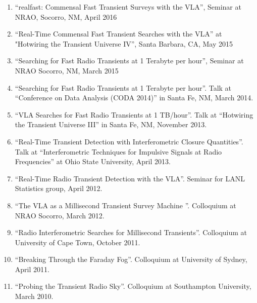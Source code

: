\documentclass[11pt]{article}
\begin{document}
\begin{enumerate}


    \item ``realfast: Commensal Fast Transient Surveys with the VLA'', Seminar at NRAO, Socorro, NM, April 2016

    \item ``Real-Time Commensal Fast Transient Searches with the VLA'' at "Hotwiring the Transient Universe IV'', Santa Barbara, CA, May 2015

    \item ``Searching for Fast Radio Transients at 1 Terabyte per hour'', Seminar at NRAO Socorro, NM, March 2015

    \item ``Searching for Fast Radio Transients at 1 Terabyte per hour''. Talk at ``Conference on Data Analysis (CODA 2014)'' in Santa Fe, NM, March 2014.

    \item ``VLA Searches for Fast Radio Transients at 1 TB/hour''. Talk at ``Hotwiring the Transient Universe III'' in Santa Fe, NM, November 2013.

    \item ``Real-Time Transient Detection with Interferometric Closure Quantities''. Talk at ``Interferometric Techniques for Impulsive Signals at Radio Frequencies'' at Ohio State University, April 2013.

    \item ``Real-Time Radio Transient Detection with the VLA''. Seminar for LANL Statistics group, April 2012.

    \item ``The VLA as a Millisecond Transient Survey Machine ''. Colloquium at NRAO Socorro, March 2012.

    \item ``Radio Interferometric Searches for Millisecond Transients''. Colloquium at University of Cape Town, October 2011.

    \item ``Breaking Through the Faraday Fog''. Colloquium at University of Sydney, April 2011.

    \item ``Probing the Transient Radio Sky''. Colloquium at Southampton University, March 2010.
\end{enumerate}
\end{document}
